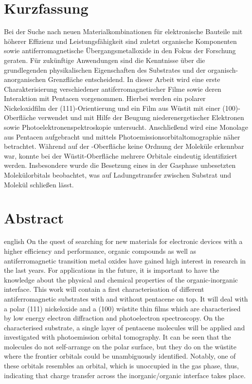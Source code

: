 \thispagestyle{plain}

\section*{Kurzfassung}
Bei der Suche nach neuen Materialkombinationen für elektronische Bauteile mit höherer Effizienz und Leistungsfähigkeit sind zuletzt organische Komponenten sowie antiferromagnetische Übergangsmetalloxide in den Fokus der Forschung geraten.
Für zukünftige Anwendungen sind die Kenntnisse über die grundlegenden physikalischen Eigenschaften des Substrates und der organisch-anorganischen Grenzfläche entscheidend.
In dieser Arbeit wird eine erste Charakterisierung verschiedener antiferromagnetischer Filme sowie deren Interaktion mit Pentacen vorgenommen.
Hierbei werden ein polarer Nickeloxidfilm der (111)-Orientierung und ein Film aus Wüstit mit einer (100)-Oberfläche verwendet und mit Hilfe der Beugung niederenergetischer Elektronen sowie Photoelektronenspektroskopie untersucht.
Anschließend wird eine Monolage aus Pentacen aufgebracht und mittels Photoemissionsorbitaltomographie näher betrachtet.
Während auf der -Oberfläche keine Ordnung der Moleküle erkennbar war, konnte bei der Wüstit-Oberfläche mehrere Orbitale eindeutig identifiziert werden.
Insbesondere wurde die Besetzung eines in der Gasphase unbesetzten Molekülorbitals beobachtet, was auf Ladungstransfer zwischen Substrat und Molekül schließen lässt.

\section*{Abstract}
\begin{foreignlanguage}{english}
    On the quest of searching for new materials for electronic devices with a higher efficiency and performance, organic compounds as well as antiferromagnetic transition metal oxides have gained high interest in research in the last years.
    For applications in the future, it is important to have the knowledge about the physical and chemical properties of the organic-inorganic interface.
    This work will contain a first characterisation of different antiferromagnetic substrates with and without pentacene on top.
    It will deal with a polar (111) nickeloxide and a (100) wüstite thin films which are characterised by low energy electron diffraction and photoelectron spectroscopy.
    On the characterised substrate, a single layer of pentacene molecules will be applied and investigated with photoemission orbital tomography.
    It can be seen that the molecules do not self-arrange on the polar surface, but they do on the wüstite where the frontier orbitals could be unambiguously identified.
    Notably, one of these orbitals resembles an orbital, which is unoccupied in the gas phase, thus, indicating that charge transfer across the inorganic/organic interface takes place.
\end{foreignlanguage}
